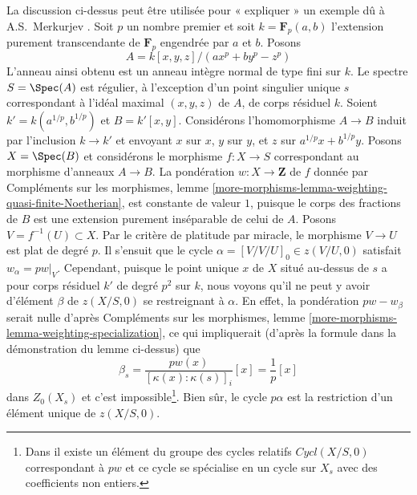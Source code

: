 \begin{example} 
\label{example-Merkurjev} La
 discussion ci-dessus peut être utilisée pour « expliquer » un exemple dû 
à A.S.~Merkurjev \cite[exemple 3.5.10]{SV}. Soit  $p$  un nombre premier 
et soit  $k = \mathbf{F}_p(a, b)$  l'extension purement transcendante 
de  $\mathbf{F}_p$ engendrée par  $a$  et  $b$. Posons 
$$
A = k[x, y, z]/(a x^p + b y^p - z^p)
$$
 L'anneau ainsi obtenu est un anneau intègre normal de type fini sur  $k$. Le spectre  
$S = \Spec(A)$ est régulier, à l'exception d'un point singulier unique  $s$
  correspondant à l'idéal maximal  $(x, y, z)$  de  $A$, de corps résiduel  $k$. 
Soient  $k' = k(a^{1/p}, b^{1/p})$  et  $B = k'[x, y]$. Considérons l'homomorphisme  
$A \to B$ induit par l'inclusion  $k \to k'$ et envoyant  $x$  sur  $x$, $y$  sur  $y$,
 et  $z$  sur  $a^{1/p}x + b^{1/p}y$. Posons $X = \Spec(B)$  et considérons le morphisme  
$f : X \to S$  correspondant au morphisme d'anneaux  $A \to B$.
 La pondération  $w : X \to \mathbf{Z}$  de  $f$
  donnée par Compléments sur les morphismes, lemme 
\ref{more-morphisms-lemma-weighting-quasi-finite-Noetherian}, est 
constante de valeur  $1$, puisque le corps des fractions de  $B$  est une extension purement inséparable de 
celui de  $A$. 
Posons  $V = f^{-1}(U) \subset X$. Par le critère de platitude par miracle, le morphisme  
$V \to U$ est plat de degré  $p$. Il s'ensuit que le cycle  
$\alpha = [V/V/U]_0 \in z(V/U, 0)$  satisfait $w_\alpha = pw|_V$.
 Cependant, puisque le point unique  $x$  de  $X$ situé au-dessus de  $s$
  a pour corps résiduel  $k'$  de degré $p^2$  sur  $k$, nous voyons 
qu'il ne peut y avoir d'élément $\beta$  de  $z(X/S, 0)$  se restreignant à  $\alpha$.
 En effet, la pondération $pw - w_\beta$  serait nulle d'après Compléments sur les morphismes,
 lemme \ref{more-morphisms-lemma-weighting-specialization}, ce qui 
impliquerait (d'après la formule dans la démonstration du lemme ci-dessus) que 
$$
\beta_s = \frac{pw(x)}{[\kappa(x) : \kappa(s)]_i} [x] =
\frac{1}{p}[x]
$$
 dans  $Z_0(X_s)$  et c'est impossible\footnote{Dans  \cite{SV}  il existe
 un élément du groupe des cycles relatifs  $Cycl(X/S, 0)$
  correspondant à $pw$  et ce cycle se spécialise en un cycle sur
  $X_s$  avec des coefficients non entiers.}. Bien sûr,
 le cycle  $p\alpha$  est la restriction d'un élément unique de  
$z(X/S, 0)$. 
\end{example} 









